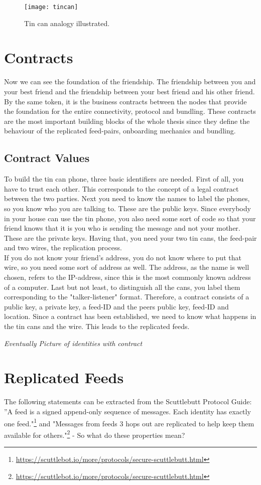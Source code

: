 \begin{figure}
    \centering
    \texttt{[image: tincan]}
    \caption{Tin can analogy illustrated.}
    \label{fig:tincan}
\end{figure}

\section{Contracts}
Now we can see the foundation of the friendship. The friendship between you and your best friend and the friendship between your best friend and his other friend. By the same token, it is the business contracts between the nodes that provide the foundation for the entire connectivity, protocol and bundling. These contracts are the most important building blocks of the whole thesis since they define the behaviour of the replicated feed-pairs, onboarding mechanics and bundling.

\subsection{Contract Values}
To build the tin can phone, three basic identifiers are needed. First of all, you have to trust each other. This corresponds to the concept of a legal contract between the two parties. Next you need to know the names to label the phones, so you know who you are talking to. These are the public keys. Since everybody in your house can use the tin phone, you also need some sort of code so that your friend knows that it is you who is sending the message and not your mother. These are the private keys. Having that, you need your two tin cans, the feed-pair and two wires, the replication process.
\\
If you do not know your friend’s address, you do not know where to put that wire, so you need some sort of address as well. The address, as the name is well chosen, refers to the IP-address, since this is the most commonly known address of a computer. Last but not least, to distinguish all the cans, you label them corresponding to the "talker-listener" format. Therefore, a contract consists of a public key, a private key, a feed-ID and the peers public key, feed-ID and location. Since a contract has been established, we need to know what happens in the tin cans and the wire. This leads to the replicated feeds. 

\textit{Eventually Picture of identities with contract}

\section{Replicated Feeds}
The following statements can be extracted from the Scuttlebutt Protocol Guide: ”A feed is a signed append-only sequence of messages. Each identity has exactly one feed."\footnote{\url{https://scuttlebot.io/more/protocols/secure-scuttlebutt.html}} and "Messages from feeds 3 hops out are replicated to help keep them available for others."\footnote{\url{https://scuttlebot.io/more/protocols/secure-scuttlebutt.html}} - So what do these properties mean?\\

